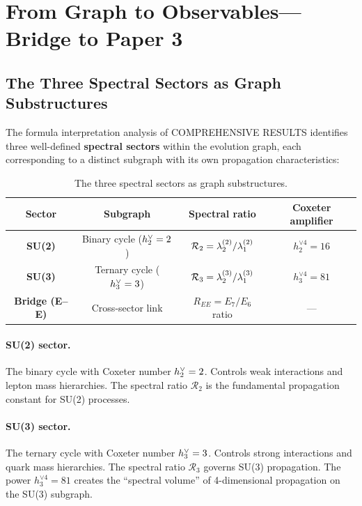 \section{From Graph to Observables---Bridge to Paper 3}\label{sec:bridge}

\subsection{The Three Spectral Sectors as Graph Substructures}\label{sec:three_sectors}

The formula interpretation analysis of COMPREHENSIVE RESULTS identifies three well-defined \textbf{spectral sectors} within the evolution graph, each corresponding to a distinct subgraph with its own propagation characteristics:

\begin{table}[h]
\centering
\begin{tabular}{c c c c}
\hline\hline
Sector & Subgraph & Spectral ratio & Coxeter amplifier \\
\hline
\textbf{SU(2)} & Binary cycle ($h^\vee_2 = 2$) & $\mathcal{R}_2 = \lambda_2^{(2)}/\lambda_1^{(2)}$ & $h_2^{\vee 4} = 16$ \\
\textbf{SU(3)} & Ternary cycle ($h^\vee_3 = 3$) & $\mathcal{R}_3 = \lambda_2^{(3)}/\lambda_1^{(3)}$ & $h_3^{\vee 4} = 81$ \\
\textbf{Bridge (E--E)} & Cross-sector link & $R_{EE} = E_7/E_6$ ratio & --- \\
\hline\hline
\end{tabular}
\caption{The three spectral sectors as graph substructures.}
\end{table}

\paragraph{SU(2) sector.} The binary cycle with Coxeter number $h^\vee_2 = 2$. Controls weak interactions and lepton mass hierarchies. The spectral ratio $\mathcal{R}_2$ is the fundamental propagation constant for SU(2) processes.

\paragraph{SU(3) sector.} The ternary cycle with Coxeter number $h^\vee_3 = 3$. Controls strong interactions and quark mass hierarchies. The spectral ratio $\mathcal{R}_3$ governs SU(3) propagation. The power $h_3^{\vee 4} = 81$ creates the ``spectral volume'' of 4-dimensional propagation on the SU(3) subgraph.

